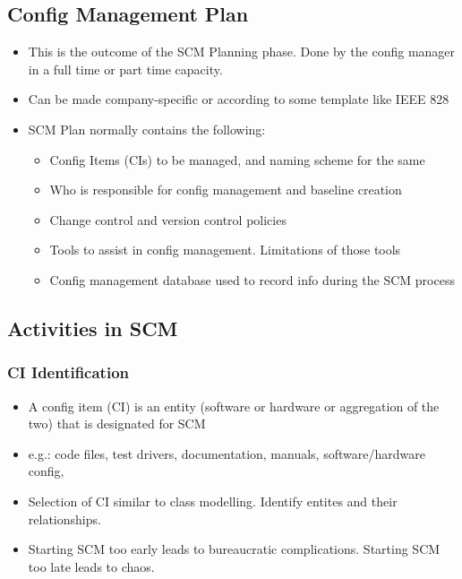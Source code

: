 \documentclass{article}
\begin{document}
\subsection{Config Management Plan}
\begin{itemize}
    \item This is the outcome of the SCM Planning phase. Done by the config manager in a full time or part time capacity. 
    
    \item Can be made company-specific or according to some template like IEEE 828
    
    \item SCM Plan normally contains the following:
    \begin{itemize}
        \item Config Items (CIs) to be managed, and naming scheme for the same
        
        \item Who is responsible for config management and baseline creation
        
        \item Change control and version control policies
        
        \item Tools to assist in config management. Limitations of those tools
        
        \item Config management database used to record info during the SCM process
    \end{itemize}
\end{itemize}

\subsection{Activities in SCM}
\subsubsection{CI Identification}
\begin{itemize}
    \item A config item (CI) is an entity (software or hardware or aggregation of the two) that is designated for SCM 
    
    \item e.g.: code files, test drivers, documentation, manuals, software/hardware config, 
    
    \item Selection of CI similar to class modelling. Identify entites and their relationships. 
    
    \item Starting SCM too early leads to bureaucratic complications. Starting SCM too late leads to chaos.
\end{itemize}
\end{document}
